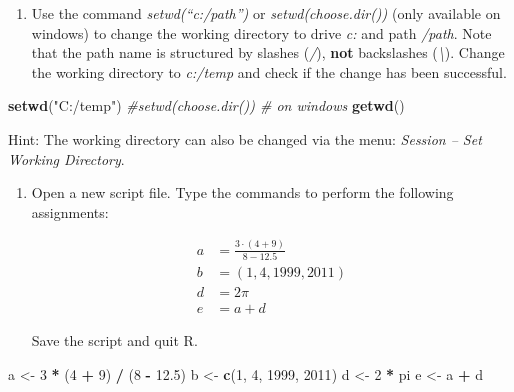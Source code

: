 \documentclass[]{article}
\newenvironment{Shaded}{\begin{snugshade}}{\end{snugshade}}
\newcommand{\KeywordTok}[1]{\textcolor[rgb]{0.13,0.29,0.53}{\textbf{#1}}}
\newcommand{\DecValTok}[1]{\textcolor[rgb]{0.00,0.00,0.81}{#1}}
\newcommand{\FloatTok}[1]{\textcolor[rgb]{0.00,0.00,0.81}{#1}}
\newcommand{\StringTok}[1]{\textcolor[rgb]{0.31,0.60,0.02}{#1}}
\newcommand{\CommentTok}[1]{\textcolor[rgb]{0.56,0.35,0.01}{\textit{#1}}}
\newcommand{\OperatorTok}[1]{\textcolor[rgb]{0.81,0.36,0.00}{\textbf{#1}}}
\newcommand{\NormalTok}[1]{#1}
\providecommand{\tightlist}{%
  \setlength{\itemsep}{0pt}\setlength{\parskip}{0pt}}
\begin{document}
\begin{enumerate}
\def\labelenumi{\arabic{enumi}.}
\setcounter{enumi}{5}
\tightlist
\item
  Use the command \emph{setwd(``c:/path'')} or
  \emph{setwd(choose.dir())} (only available on windows) to change the
  working directory to drive \emph{c:} and path \emph{/path}. Note that
  the path name is structured by slashes (\emph{/}), \textbf{not}
  backslashes (\emph{\textbackslash{}}). Change the working directory to
  \emph{c:/temp} and check if the change has been successful.
\end{enumerate}

\begin{Shaded}
\begin{Highlighting}[]
\KeywordTok{setwd}\NormalTok{(}\StringTok{"C:/temp"}\NormalTok{)}
\CommentTok{#setwd(choose.dir()) # on windows}
\KeywordTok{getwd}\NormalTok{()}
\end{Highlighting}
\end{Shaded}

Hint: The working directory can also be changed via the menu:
\emph{Session -- Set Working Directory}.

\begin{enumerate}
\def\labelenumi{\arabic{enumi}.}
\setcounter{enumi}{6}
\tightlist
\item
  Open a new script file. Type the commands to perform the following
  assignments:

  \begin{align*}
  a &=\frac{3\cdot (4+9)}{8-12.5} \\
  b &=\left( 1,4,1999,2011\right) \\
  d &=2\pi \\
  e &=a+d
  \end{align*}

  Save the script and quit R.
\end{enumerate}

\begin{Shaded}
\begin{Highlighting}[]
\NormalTok{a <-}\StringTok{ }\DecValTok{3} \OperatorTok{*}\StringTok{ }\NormalTok{(}\DecValTok{4} \OperatorTok{+}\StringTok{ }\DecValTok{9}\NormalTok{) }\OperatorTok{/}\StringTok{ }\NormalTok{(}\DecValTok{8} \OperatorTok{-}\StringTok{ }\FloatTok{12.5}\NormalTok{)}
\NormalTok{b <-}\StringTok{ }\KeywordTok{c}\NormalTok{(}\DecValTok{1}\NormalTok{, }\DecValTok{4}\NormalTok{, }\DecValTok{1999}\NormalTok{, }\DecValTok{2011}\NormalTok{)}
\NormalTok{d <-}\StringTok{ }\DecValTok{2} \OperatorTok{*}\StringTok{ }\NormalTok{pi}
\NormalTok{e <-}\StringTok{ }\NormalTok{a }\OperatorTok{+}\StringTok{ }\NormalTok{d}
\end{Highlighting}
\end{Shaded}
\end{document}

